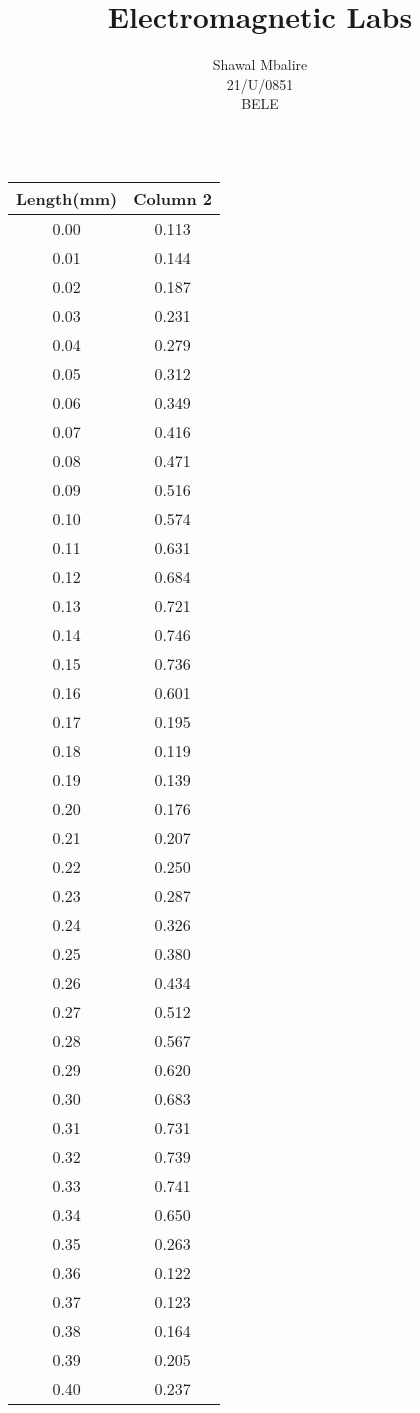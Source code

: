 \documentclass{report}
\title{Electromagnetic Labs}
\author{Shawal Mbalire \\21/U/0851 \\BELE}
\begin{document}
    \maketitle


    \begin{table}[H]
        \centering
        \begin{tabular}{cc}
        \hline
        Length(mm) & Column 2 \\
        \hline
        0.00 & 0.113 \\
        0.01 & 0.144 \\
        0.02 & 0.187 \\
        0.03 & 0.231 \\
        0.04 & 0.279 \\
        0.05 & 0.312 \\
        0.06 & 0.349 \\
        0.07 & 0.416 \\
        0.08 & 0.471 \\
        0.09 & 0.516 \\
        0.10 & 0.574 \\
        0.11 & 0.631 \\
        0.12 & 0.684 \\
        0.13 & 0.721 \\
        0.14 & 0.746 \\
        0.15 & 0.736 \\
        0.16 & 0.601 \\
        0.17 & 0.195 \\
        0.18 & 0.119 \\
        0.19 & 0.139 \\
        0.20 & 0.176 \\
        0.21 & 0.207 \\
        0.22 & 0.250 \\
        0.23 & 0.287 \\
        0.24 & 0.326 \\
        0.25 & 0.380 \\
        0.26 & 0.434 \\
        0.27 & 0.512 \\
        0.28 & 0.567 \\
        0.29 & 0.620 \\
        0.30 & 0.683 \\
        0.31 & 0.731 \\
        0.32 & 0.739 \\
        0.33 & 0.741 \\
        0.34 & 0.650 \\
        0.35 & 0.263 \\
        0.36 & 0.122 \\
        0.37 & 0.123 \\
        0.38 & 0.164 \\
        0.39 & 0.205 \\
        0.40 & 0.237 \\
        \hline
        \end{tabular}
        \caption{}
    \end{table}
\end{document}
